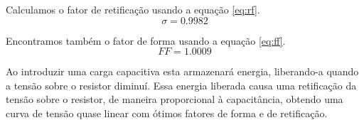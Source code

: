 \documentclass{report}
\begin{document}
Calculamos o fator de retificação usando a equação \ref{eq:rf}.
\begin{equation}
\sigma = 0.9982
\end{equation}

Encontramos também o fator de forma usando a equação \ref{eq:ff}.
\begin{equation}
FF = 1.0009
\end{equation}

Ao introduzir uma carga capacitiva esta armazenará energia, liberando-a quando a tensão sobre o resistor diminuí. Essa energia liberada causa uma retificação da tensão sobre o resistor, de maneira proporcional à capacitância, obtendo uma curva de tensão quase linear com ótimos fatores de forma e de retificação.


\end{document}
